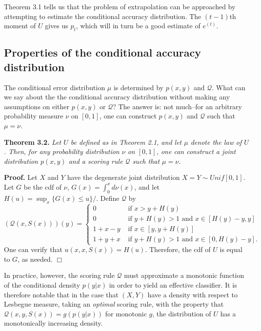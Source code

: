 \documentclass{article}
\begin{document}
Theorem 3.1 tells us that the problem of extrapolation can be
approached by attempting to estimate the conditional accuracy
distribution.  The $(t-1)$th moment of $U$ gives us $p_t$, which will
in turn be a good estimate of $e^{(t)}$.

\subsection{Properties of the conditional accuracy distribution}

The conditional error distribution $\mu$ is determined by $p(x, y)$
and $\mathcal{Q}$.  What can we say about the the conditional accuracy
distribution without making any assumptions on either $p(x, y)$ or
$\mathcal{Q}$?  The answer is: not much--for an arbitrary probability
measure $\nu$ on $[0,1]$, one can construct $p(x, y)$ and
$\mathcal{Q}$ such that $\mu = \nu$.

\noindent\textbf{Theorem 3.2.} \emph{ Let $U$ be defined as in Theorem
  2.1, and let $\mu$ denote the law of $U$.  Then, for any probability
  distribution $\nu$ on $[0,1]$, one can construct a joint
  distribution $p(x, y)$ and a scoring rule $\mathcal{Q}$ such that 
  $\mu = \nu$.
}

\noindent\textbf{Proof.}  
Let $X$ and $Y$ have the degenerate joint distribution $X= Y \sim Unif[0, 1]$.
Let $G$ be the cdf of $\nu$, $G(x) = \int_0^x d\nu(x)$, and let $H(u) = \sup_x \{G(x) \leq u\}/$.
Define $\mathcal{Q}$ by
\[
\left(\mathcal{Q}(x, S(x))\right)(y) = \begin{cases}
0 &\text{ if }x > y + H(y)\\
0 & \text{ if }y + H(y) > 1 \text{ and }x \in [H(y) - y, y]\\
1 + x - y &\text{ if } x \in [y, y + H(y)]\\
1 + y + x &\text{ if }y + H(y) > 1 \text{ and }x \in [0, H(y) - y]. 
\end{cases}
\]
One can verify that $u(x, x, S(x)) = H(u).$  Therefore, the cdf of $U$ is equal to $G$, as needed. $\Box$

In practice, however, the scoring rule $\mathcal{Q}$ must approximate a monotonic function of the conditional density $p(y|x)$
in order to yield an effective classifier.  It is therefore notable that in the case that $(X, Y)$ have a density with respect to Lesbegue measure,
taking an \emph{optimal} scoring rule,
with the property that $\mathcal{Q}(x, y, S(x)) = g(p(y|x))$ for monotonic $g$,
the distribution of $U$ has a monotonically increasing density.
\end{document}
